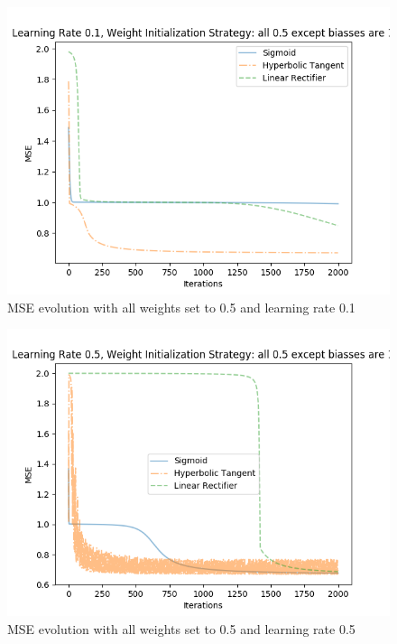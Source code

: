 \documentclass{article}
\begin{document}
\begin{figure}[H]
\centering
\includegraphics[width=0.9\linewidth]{img/mse_all05exceptbiassesare1_01.png}
\caption{MSE evolution with all weights set to 0.5 and learning rate 0.1}
\label{fig:mse0501}
\end{figure}
\begin{figure}[H]
\centering
\includegraphics[width=0.9\linewidth]{img/mse_all05exceptbiassesare1_05.png}
\caption{MSE evolution with all weights set to 0.5 and learning rate 0.5}
\label{fig:mse0505}
\end{figure}
\end{document}
